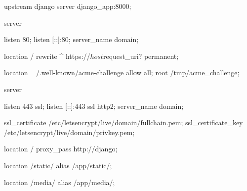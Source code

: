 upstream django {
    server django_app:8000;
}

server {
    listen 80;
    listen [::]:80;
    server_name {domain};

    location / {
        rewrite ^ https://$host$request_uri? permanent;
    }

    location ~ /.well-known/acme-challenge {
        allow all;
        root /tmp/acme_challenge;
    }
}

server {
    listen 443 ssl;
    listen [::]:443 ssl http2;
    server_name {domain};

    ssl_certificate /etc/letsencrypt/live/{domain}/fullchain.pem;
    ssl_certificate_key /etc/letsencrypt/live/{domain}/privkey.pem;

    location / {
        proxy_pass http://django;
    }

    location /static/ {
        alias /app/static/;
    }

    location /media/ {
        alias /app/media/;
    }
}